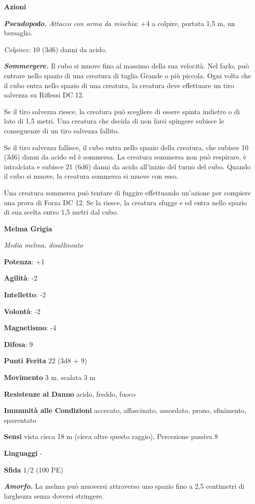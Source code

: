 \begin{multicols}{2}
\textbf{Azioni}

\emph{\textbf{Pseudopodo.} Attacco con arma da mischia}: +4 a colpire,
portata 1,5 m, un bersaglio.

\emph{Colpisce:} 10 (3d6) danni da acido.

\emph{\textbf{Sommergere.}} Il cubo si muove fino al massimo della sua
velocità. Nel farlo, può entrare nello spazio di una creatura di taglia
Grande o più piccola. Ogni volta che il cubo entra nello spazio di una
creatura, la creatura deve effettuare un tiro salvezza su Riflessi DC
12.

Se il tiro salvezza riesce, la creatura può scegliere di essere spinta
indietro o di lato di 1,5 metri. Una creatura che decida di non farsi
spingere subisce le conseguenze di un tiro salvezza fallito.

Se il tiro salvezza fallisce, il cubo entra nello spazio della creatura,
che subisce 10 (3d6) danni da acido ed è sommersa. La creatura sommersa
non può respirare, è intralciata e subisce 21 (6d6) danni da acido
all'inizio del turno del cubo. Quando il cubo si muove, la creatura
sommersa si muove con esso.

Una creatura sommersa può tentare di fuggire effettuando un'azione per
compiere una prova di Forza DC 12. Se la riesce, la creatura sfugge e ed
entra nello spazio di sua scelta entro 1,5 metri dal cubo.

\textbf{Melma Grigia}

\emph{Media melma, disallineato}

\textbf{Potenza}: +1

\textbf{Agilità}: -2

\textbf{Intelletto}: -2

\textbf{Volontà}: -2

\textbf{Magnetismo}: -4

\textbf{Difesa}: 9

\textbf{Punti Ferita} 22 (3d8 + 9)

\textbf{Movimento} 3 m, scalata 3 m

\textbf{Resistenze al Danno} acido, freddo, fuoco

\textbf{Immunità alle Condizioni} accecato, affascinato, assordato,
prono, sfinimento, spaventato

\textbf{Sensi} vista cieca 18 m (cieca oltre questo raggio), Percezione
passiva 8

\textbf{Linguaggi} -

\textbf{Sfida} 1/2 (100 PE)

\emph{\textbf{Amorfo.}} La melma può muoversi attraverso uno spazio fino
a 2,5 centimetri di larghezza senza doversi stringere.


\end{multicols}
